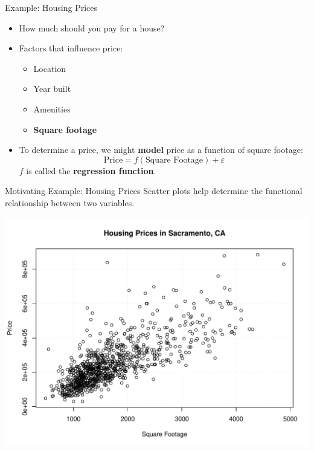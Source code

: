 \documentclass[handout]{beamer}
\begin{document}
\begin{frame}{Example: Housing Prices}
    \begin{itemize}[<+->]
        \item How much should you pay for a house?
        \item Factors that influence price:
        \begin{itemize}
            \item Location
            \item Year built
            \item Amenities
            \item \textbf{Square footage}
        \end{itemize}
        \item To determine a price, we might \textbf{model} price as a function of square footage:
        \begin{equation*}
            \textrm{Price} = f(\textrm{Square Footage}) + \varepsilon
        \end{equation*}
        $f$ is called the \textbf{regression function}.
    \end{itemize}
\end{frame}

\begin{frame}{Motivating Example: Housing Prices}
    Scatter plots help determine the functional relationship between two variables.
    \begin{center}
        \includegraphics[width=.85\linewidth]{figures/sacramento.pdf}
    \end{center}
\end{frame}
\end{document}
